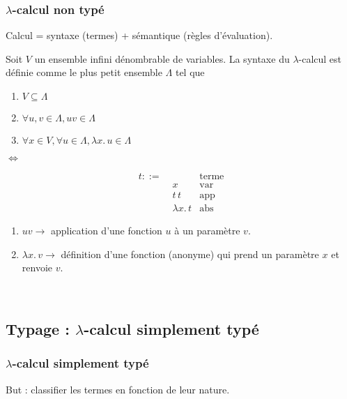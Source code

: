 \documentclass{beamer}
\newcommand{\lambdaExpr}[2]{\lambda #1 . \, #2}
\begin{document}
\begin{frame}
  \frametitle{$\lambda$-calcul non typé}
  Calcul = syntaxe (termes) + sémantique (règles d'évaluation).

  Soit $V$ un ensemble infini dénombrable de variables. La syntaxe du
  $\lambda$-calcul est définie comme le plus petit ensemble $\Lambda$ tel que

  \begin{minipage}{0.45\textwidth}
    \begin{enumerate}
    \item $V \subseteq \Lambda$
    \item $\forall u, v \in \Lambda, uv \in \Lambda$
    \item $\forall x \in V, \forall u \in \Lambda, \lambdaExpr{x}{u} \in \Lambda$
    \end{enumerate}
  \end{minipage}
  \begin{minipage}{0.05\textwidth}
    $\Leftrightarrow$
  \end{minipage}
  \begin{minipage}{0.45\textwidth}
    \begin{align*}
      t ::= & \, & \text{terme} \\
        & \; x & \text{var} \\
        & \; t \, t & \text{app} \\
        & \; \lambdaExpr{x}{t} & \text{abs}
    \end{align*}
  \end{minipage}
  \begin{enumerate}
  \item $uv \rightarrow$ application d'une fonction $u$ à un paramètre $v$.
  \item $\lambdaExpr{x}{v} \rightarrow$ définition d'une fonction (anonyme) qui
    prend un paramètre $x$ et renvoie $v$. 
  \end{enumerate}
  \
\end{frame}

\subsection{Typage : $\lambda$-calcul simplement typé}

\begin{frame}
  \frametitle{$\lambda$-calcul simplement typé}
  But : classifier les termes en fonction de leur nature.
\end{frame}
\end{document}

